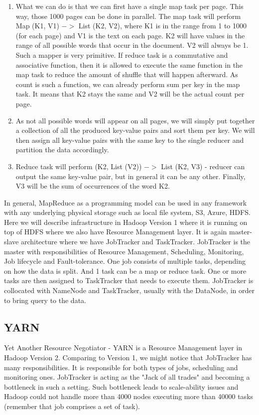 \begin{enumerate}
	\item What we can do is that we can first have a single map task per page. This way, those 1000 pages can be done in parallel. The map task will perform Map (K1, V1) $->$ List (K2, V2), where K1 is in the range from 1 to 1000 (for each page) and V1 is the text on each page. K2 will have values in the range of all possible words that occur in the document. V2 will always be 1. Such a mapper is very primitive. If reduce task is a commutative and associative function, then it is allowed to execute the same function in the map task to reduce the amount of shuffle that will happen afterward. As count is such a function, we can already perform sum per key in the map task. It means that K2 stays the same and V2 will be the actual count per page.
	\item As not all possible words will appear on all pages, we will simply put together a collection of all the produced key-value pairs and sort them per key. We will then assign all key-value pairs with the same key to the single reducer and partition the data accordingly.
	\item Reduce task will perform (K2, List (V2)) $->$ List (K2, V3) - reducer can output the same key-value pair, but in general it can be any other. Finally, V3 will be the sum of occurrences of the word K2.
\end{enumerate}
   
In general, MapReduce as a programming model can be used in any framework with any underlying physical storage such as local file system, S3, Azure, HDFS. Here we will describe infrastructure in Hadoop Version 1 where it is running on top of HDFS where we also have Resource Management layer. It is again master-slave architecture where we have JobTracker and TaskTracker. JobTracker is the master with responsibilities of Resource Management, Scheduling, Monitoring, Job lifecycle and Fault-tolerance. One job consists of multiple tasks, depending on how the data is split. And 1 task can be a map or reduce task. One or more tasks are then assigned to TaskTracker that needs to execute them. JobTracker is collocated with NameNode and TaskTracker, usually with the DataNode, in order to bring query to the data. 

\subsection{YARN}
Yet Another Resource Negotiator -  YARN \cite{YARN} is a Resource Management layer in Hadoop Version 2. Comparing to Version 1, we might notice that JobTracker has many responsibilities. It is responsible for both types of jobs, scheduling and monitoring ones. JobTracker is acting as the "Jack of all trades" and becoming a bottleneck in such a setting. Such bottleneck leads to scale-ability issues and Hadoop could not handle more than 4000 nodes executing more than 40000 tasks (remember that job comprises a set of task). 


